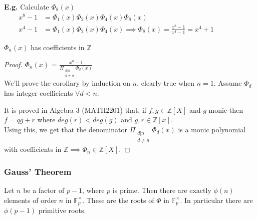 \documentclass[11pt]{article}
\begin{document}
\textbf{E.g.} Calculate $\Phi_8(x)$
\begin{align*}
	x^8-1 &= \Phi_1(x) \Phi_2(x) \Phi_4(x) \Phi_8(x) &&&&&\\[1em]
	x^4-1 &= \Phi_1(x) \Phi_2(x) \Phi_4(x) \implies \Phi_8(x) = \frac{x^8-1}{x^4-1} = x^4+1 
\end{align*} 

\begin{corollary}
	$\Phi_n(x)$ has coefficients in $\mathbb{Z}$
\end{corollary}

\begin{proof}
	$\Phi_n(x)$ = \LARGE{$\frac{x^n-1}{\Pi_{\substack{d|n \\ d\neq n}}\Phi_d(x) }$}\\[0.5em]
	\normalsize
We'll prove the corollary by induction on $n$, clearly true when $n=1$. Assume $\Phi_d$ has integer coefficients $\forall d<n$.

It is proved in Algebra 3 (MATH2201) that, if $f,g \in \mathbb{Z}[X] $ and $g$ monic then $f=qg+r$ where $deg(r) < deg(g)$ and $g,r \in \mathbb{Z}[x]$. \\
Using this, we get that the denominator $\Pi_{\substack{ d|n \\ d \neq n}} \Phi_d (x) $ is a monic polynomial with coefficients in $\mathbb{Z} \implies \Phi_n \in \mathbb{Z}[X].$
\end{proof}

\subsubsection{Gauss' Theorem}
\begin{theorem}
	Let $n$ be a factor of $p-1$, where $p$ is prime. Then there are exactly $\phi(n)$ elements of order $n$ in $\mathbb{F}^\times_p$. These are the roots of $\Phi $ in $\mathbb{F}^\times_p$. In particular there are $\phi(p-1)$ primitive roots.
\end{theorem}
\end{document}
